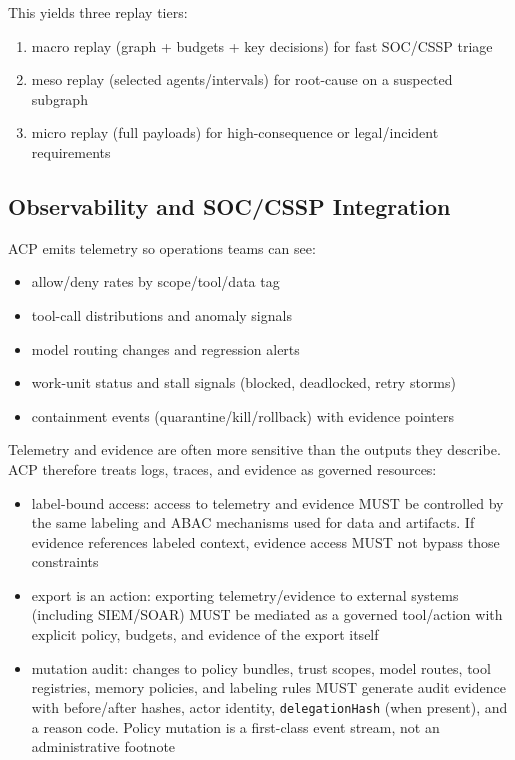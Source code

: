 \documentclass[11pt]{article}
\begin{document}
This yields three replay tiers:

\begin{enumerate}
\def\labelenumi{\arabic{enumi})}
\tightlist
\item
  macro replay (graph + budgets + key decisions) for fast SOC/CSSP
  triage
\item
  meso replay (selected agents/intervals) for root-cause on a suspected
  subgraph
\item
  micro replay (full payloads) for high-consequence or legal/incident
  requirements
\end{enumerate}

\hypertarget{observability-and-soccssp-integration}{%
\subsection{Observability and SOC/CSSP Integration}\label{observability-and-soccssp-integration}}

ACP emits telemetry so operations teams can see:

\begin{itemize}
\tightlist
\item
  allow/deny rates by scope/tool/data tag
\item
  tool-call distributions and anomaly signals
\item
  model routing changes and regression alerts
\item
  work-unit status and stall signals (blocked, deadlocked, retry storms)
\item
  containment events (quarantine/kill/rollback) with evidence pointers
\end{itemize}

Telemetry and evidence are often more sensitive than the outputs they
describe. ACP therefore treats logs, traces, and evidence as governed
resources:

\begin{itemize}
\tightlist
\item
  label-bound access: access to telemetry and evidence MUST be
  controlled by the same labeling and ABAC mechanisms used for data and
  artifacts. If evidence references labeled context, evidence access
  MUST not bypass those constraints
\item
  export is an action: exporting telemetry/evidence to external systems
  (including SIEM/SOAR) MUST be mediated as a governed tool/action with
  explicit policy, budgets, and evidence of the export itself
\item
  mutation audit: changes to policy bundles, trust scopes, model routes,
  tool registries, memory policies, and labeling rules MUST generate
  audit evidence with before/after hashes, actor identity,
  \texttt{delegationHash} (when present), and a reason code. Policy
  mutation is a first-class event stream, not an administrative footnote
\end{itemize}
\end{document}
